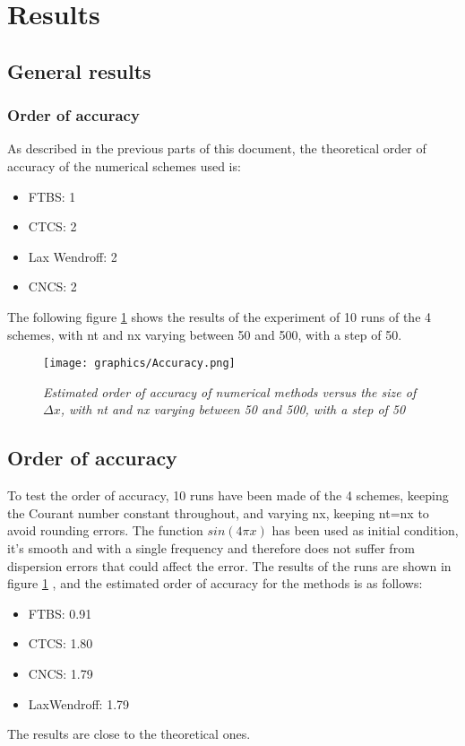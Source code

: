 

\section{Results}

\subsection{General results}

\subsubsection{Order of accuracy}
As described in the previous parts of this document, the theoretical order of accuracy of the numerical schemes used is:
\begin{itemize}
	\item FTBS: 1
	\item CTCS: 2
	\item Lax Wendroff: 2
	\item CNCS: 2
\end{itemize}
The following figure \ref{fig:orderofacc} shows the results of the experiment of 10 runs of the 4 schemes, with nt and nx varying between 50 and 500, with a step of 50.
\begin{figure}[H]
	\begin{center}
		\texttt{[image: graphics/Accuracy.png]}
	\end{center}%
	\caption[Order of accuracy of numerical methods]{ \em Estimated order of accuracy of numerical methods versus the size of $\Delta x$, with nt and nx varying between 50 and 500, with a step of 50}
	\label{fig:orderofacc}
\end{figure}

\subsection{Order of accuracy}
To test the order of accuracy, 10 runs have been made of the 4 schemes, keeping the Courant number constant throughout, and varying nx, keeping nt=nx to avoid rounding errors. The function $sin(4\pi x)$ has been used as initial condition, it's smooth and with a single frequency and therefore does not suffer from dispersion errors that could affect the error.
The results of the runs are shown in figure \ref{fig:orderofacc} , and the estimated order of accuracy for the methods is as follows:
\begin{itemize}
\item FTBS: 0.91
\item CTCS: 1.80
\item CNCS: 1.79
\item LaxWendroff: 1.79
\end{itemize}
The results are close to the theoretical ones.

